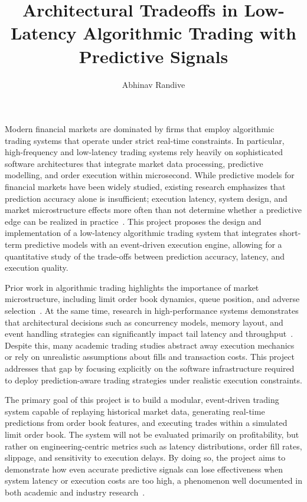 \documentclass[12pt]{article}
\title{\textbf{Architectural Tradeoffs in Low-Latency Algorithmic Trading with Predictive Signals}}
\author{Abhinav Randive}
\begin{document}
\maketitle

Modern financial markets are dominated by firms that employ algorithmic trading systems that operate under strict real-time constraints. 
In particular, high-frequency and low-latency trading systems rely heavily on sophisticated software architectures that integrate market data processing, predictive modelling, and order execution within microsecond. 
While predictive models for financial markets have been widely studied, existing research emphasizes that prediction accuracy alone is insufficient; execution latency, system design, and market microstructure effects more often than not determine whether a predictive edge can be realized in practice~\cite{aldridgeHFT, carteaMicrostructure}. 
This project proposes the design and implementation of a low-latency algorithmic trading system that integrates short-term predictive models with an event-driven execution engine, allowing for a quantitative study of the trade-offs between prediction accuracy, latency, and execution quality.

Prior work in algorithmic trading highlights the importance of market microstructure, including limit order book dynamics, queue position, and adverse selection~\cite{harrisTrading}. 
At the same time, research in high-performance systems demonstrates that architectural decisions such as concurrency models, memory layout, and event handling strategies can significantly impact tail latency and throughput~\cite{stonebrakerLatency}. 
Despite this, many academic trading studies abstract away execution mechanics or rely on unrealistic assumptions about fills and transaction costs. This project addresses that gap by focusing explicitly on the software infrastructure required to deploy prediction-aware trading strategies under realistic execution constraints.


The primary goal of this project is to build a modular, event-driven trading system capable of replaying historical market data, generating real-time predictions from order book features, and executing trades within a simulated limit order book. 
The system will not be evaluated primarily on profitability, but rather on engineering-centric metrics such as latency distributions, order fill rates, slippage, and sensitivity to execution delays. 
By doing so, the project aims to demonstrate how even accurate predictive signals can lose effectiveness when system latency or execution costs are too high, a phenomenon well documented in both academic and industry research~\cite{bouchaudTrades}.
\end{document}
